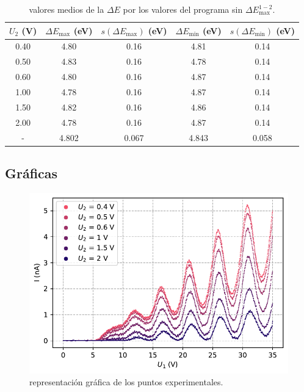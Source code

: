 \documentclass[12pt,a4paper]{article}
\numberwithin{equation}{section}
\numberwithin{figure}{section}
\begin{document}
\begin{table}[h!] \centering 
\begin{tabular}{ccccc} 
\hline $U_2$ (V) & $ \Delta E_{\max} $ (eV) & $s(\Delta E_{\max})$ (eV) & $ \Delta E_{\min} $ (eV) & $s(\Delta E_{\min})$ (eV) \\ \hline 
0.40 & 4.80 & 0.16 & 4.81 & 0.14 \\ 
0.50 & 4.83 & 0.16 & 4.78 & 0.14 \\ 
0.60 & 4.80 & 0.16 & 4.87 & 0.14 \\ 
1.00 & 4.78 & 0.16 & 4.87 & 0.14 \\ 
1.50 & 4.82 & 0.16 & 4.86 & 0.14 \\ 
2.00 & 4.78 & 0.16 & 4.87 & 0.14 \\ 
\hline  \hline 
- & 4.802 & 0.067 & 4.843 & 0.058 \\ 
\hline
\end{tabular}\caption{valores medios de la $\Delta E$ por los valores del programa sin $\Delta E_{\max}^{1-2}$.} 
\label{Tab:Em-2-sin-lab} 
\end{table} 

\newpage


\subsection{Gráficas}

\begin{figure}[h!] \centering
\includegraphics[scale=1.2]{FH_Hg.pdf}
\caption{representación gráfica de los puntos experimentales.}
\label{Fig:1.0}
\end{figure}

\newpage
\end{document}
